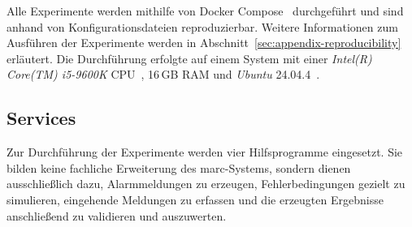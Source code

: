 Alle Experimente werden mithilfe von Docker Compose~\citep{docker_compose} durchgeführt und sind anhand von Konfigurationsdateien reproduzierbar. Weitere Informationen zum Ausführen der Experimente werden in Abschnitt~\ref{sec:appendix-reproducibility} erläutert. Die Durchführung erfolgte auf einem System mit einer \textit{Intel(R) Core(TM) i5-9600K} CPU~\citep{intel_i5_9600k}, 16\,GB RAM und \textit{Ubuntu} 24.04.4~\citep{ubuntu_24_04}.

\subsection{Services}
\label{sub-sec:services}

Zur Durchführung der Experimente werden vier Hilfsprogramme eingesetzt. Sie bilden keine fachliche Erweiterung des \gls{marc}-Systems, sondern dienen ausschließlich dazu, Alarmmeldungen zu erzeugen, Fehlerbedingungen gezielt zu simulieren, eingehende Meldungen zu erfassen und die erzeugten Ergebnisse anschließend zu validieren und auszuwerten.

